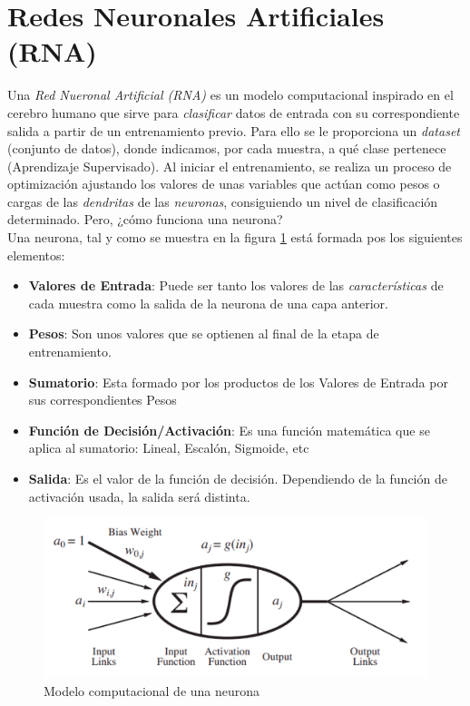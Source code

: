 \section{Redes Neuronales Artificiales (RNA)}
\label{sec:redes_neuronales}

Una \textit{Red Nueronal Artificial (RNA)} es un modelo computacional inspirado en el cerebro humano que sirve para \textit{clasificar} datos de entrada con su correspondiente salida a partir de un entrenamiento previo. Para ello se le proporciona un \textit{dataset} (conjunto de datos), donde indicamos, por cada muestra, a qué clase pertenece (Aprendizaje Supervisado). Al iniciar el entrenamiento, se realiza un proceso de optimización ajustando los valores de unas variables que actúan como pesos o cargas de las \textit{dendritas} de las \textit{neuronas}, consiguiendo un nivel de clasificación determinado. Pero, ¿cómo funciona una neurona?\\

Una neurona, tal y como se muestra en la figura \ref{fig:neurona} está formada pos los siguientes elementos:
\begin{itemize}
	\item \textbf{Valores de Entrada}: Puede ser tanto los valores de las \textit{características} de cada muestra como la salida de la neurona de una capa anterior.
	\item \textbf{Pesos}: Son unos valores que se optienen al final de la etapa de entrenamiento.
	\item \textbf{Sumatorio}: Esta formado por los productos de los Valores de Entrada por sus correspondientes Pesos
	\item \textbf{Función de Decisión/Activación}: Es una función matemática que se aplica al sumatorio: Lineal, Escalón, Sigmoide, etc
	\item \textbf{Salida}: Es el valor de la función de decisión. Dependiendo de la función de activación usada, la salida será distinta.
\end{itemize}

\begin{figure}[H]
  \begin{center}
    \includegraphics[width=15cm]{imagenes/neurona.png}
  \end{center}
  \caption[Modelo computacional de una neurona]{Modelo computacional de una neurona \cite{AIMA}}
  \label{fig:neurona}
\end{figure}

